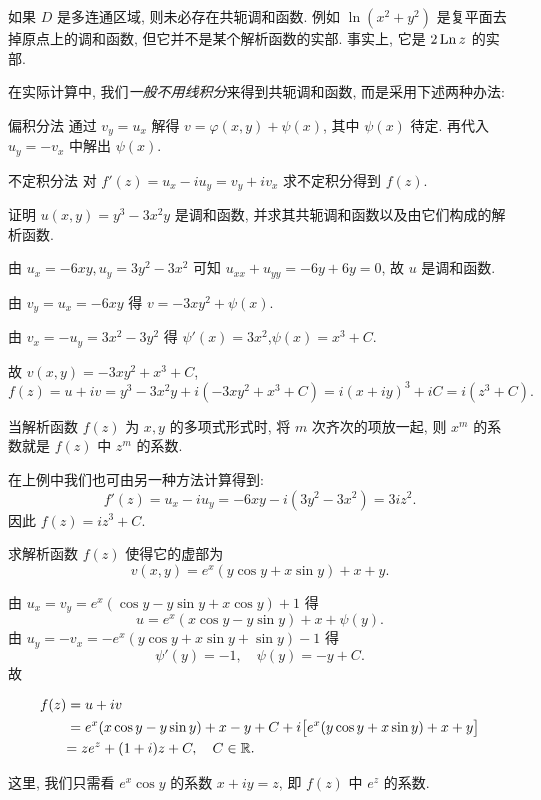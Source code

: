 如果 $D$ 是多连通区域, 则未必存在共轭调和函数.
例如 $\ln(x^2+y^2)$ 是复平面去掉原点上的调和函数, 但它并不是某个解析函数的实部.
事实上, 它是 $2\operatorname{Ln} z$ 的实部.

在实际计算中, 我们\emph{一般不用线积分}来得到共轭调和函数, 而是采用下述两种办法:
\begin{alertblock}{偏积分法}
	通过 $v_y=u_x$ 解得 $v=\varphi(x,y)+\psi(x)$, 其中 $\psi(x)$ 待定.
	{再代入 $u_y=-v_x$ 中解出 $\psi(x)$.}
\end{alertblock}
\begin{alertblock}{不定积分法}
	对 $f'(z)=u_x-iu_y=v_y+iv_x$ 求不定积分得到 $f(z)$.
\end{alertblock}

\begin{example}
	证明 $u(x,y)=y^3-3x^2y$ 是调和函数, 并求其共轭调和函数以及由它们构成的解析函数.
\end{example}

\begin{solution}
	由 $u_x=-6xy,u_y=3y^2-3x^2$ 可知 $u_{xx}+u_{yy}=-6y+6y=0$,
	{故 $u$ 是调和函数.}

	{由 $v_y=u_x=-6xy$ 得 $v=-3xy^2+\psi(x)$.}

	{由 $v_x=-u_y=3x^2-3y^2$ 得 $\psi'(x)=3x^2$,$\psi(x)=x^3+C$.}

	{故 $v(x,y)=-3xy^2+x^3+C$,
	\[
		f(z)=u+iv=y^3-3x^2y+i(-3xy^2+x^3+C)
		{=i(x+iy)^3+iC=i(z^3+C).}
	\]}
\end{solution}

当解析函数 $f(z)$ 为 $x,y$ 的多项式形式时, 将 $m$ 次齐次的项放一起, 则 $x^m$ 的系数就是 $f(z)$ 中 $z^m$ 的系数.

在上例中我们也可由另一种方法计算得到:
\[f'(z)=u_x-iu_y=-6xy-i(3y^2-3x^2)=3iz^2.\]
因此 $f(z)=iz^3+C$.

\begin{example}
	求解析函数 $f(z)$ 使得它的虚部为
	\[v(x,y)=e^x(y\cos y+x\sin y)+x+y.\]
\end{example}

\begin{solution}
	由 $u_x=v_y=e^x(\cos y-y\sin y+x\cos y)+1$ 得
	\[u=e^x(x\cos y-y\sin y)+x+\psi(y).\]
	{由 $u_y=-v_x=-e^x(y\cos y+x\sin y+\sin y)-1$ 得
	\[\psi'(y)=-1,\quad\psi(y)=-y+C.\]}
	故

	\begin{align*}
		f(z)&=u+iv\\
		&=e^x(x\cos y-y\sin y)+x-y+C
		+i\bigl[e^x(y\cos y+x\sin y)+x+y\bigr]\\
		&{=ze^z+(1+i)z+C,\quad C\in{\mathbb{R}}.}
	\end{align*}
\end{solution}
这里, 我们只需看 $e^x\cos y$ 的系数 $x+iy=z$, 即 $f(z)$ 中 $e^z$ 的系数.

